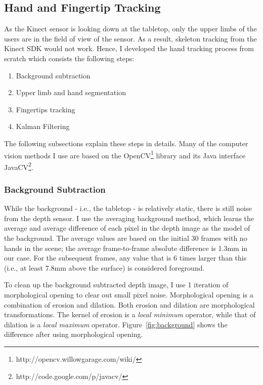 \subsection{Hand and Fingertip Tracking}
As the Kinect sensor is looking down at the tabletop, only the upper limbs of
the users are in the field of view of the sensor. As a result, skeleton
tracking from the Kinect SDK would not work. Hence, I developed the hand
tracking process from scratch which consists the following steps:

\begin{enumerate}
  \item Background subtraction
  \item Upper limb and hand segmentation
  \item Fingertips tracking
  \item Kalman Filtering
\end{enumerate}

The following subsections explain these steps in details.
Many of the computer vision methods I use are based on the OpenCV\footnote{http://opencv.willowgarage.com/wiki/} library and its Java interface 
JavaCV\footnote{http://code.google.com/p/javacv/}.

\subsubsection{Background Subtraction}
While the background - i.e., the tabletop - is relatively static, there is
still noise from the depth sensor. I use the averaging background method, which
learns the average and average difference of each pixel in the depth image as
the model of the background. The average values are based on the initial 30
frames with no hands in the scene; the average frame-to-frame absolute
difference is 1.3mm in our case. For the subsequent frames, any value that is
6 times larger than this (i.e., at least 7.8mm above the surface) is considered
foreground.

To clean up the background subtracted depth image, I use 1 iteration of
morphological opening to clear out small pixel noise. Morphological opening is a
combination of erosion and dilation. Both erosion and dilation are morphological
transformations. The kernel of erosion is a \textit{local minimum} operator,
while that of dilation is a \textit{local maximum} operator. Figure~\ref{fig:background} shows the difference after using morphological
opening.

